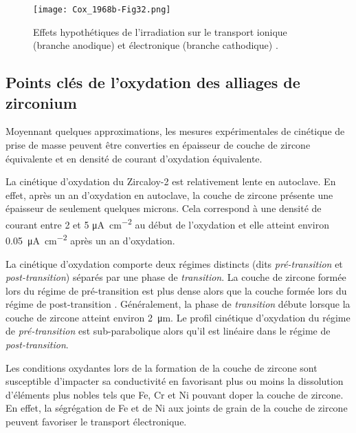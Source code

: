 \begin{refsection}
    \begin{figure}[H]
        \centering
        \texttt{[image: Cox\_1968b-Fig32.png]}
        \caption[Effets hypothétiques de l'irradiation sur le transport ionique et électronique.]
        {Effets hypothétiques de
    l'irradiation sur le transport ionique (branche anodique) et électronique
        (branche cathodique) \citep{Cox1968-1}.}
        \label{fig:irradiation_effect_IE_plots}
    \end{figure}
    

    
    \subsection{Points clés de l'oxydation des alliages de zirconium}
        
        Moyennant quelques approximations, les mesures expérimentales de cinétique de prise de masse peuvent être
        converties en épaisseur de couche de zircone équivalente et en densité de courant d'oxydation équivalente. 

        La cinétique d'oxydation du Zircaloy-2 est relativement lente en autoclave. En effet, après un an d'oxydation en
        autoclave, la couche de zircone présente une épaisseur de seulement quelques microns. Cela correspond à une
        densité de courant entre 2 et 5 \si{\micro\ampere\per\square\centi\meter} au début de l'oxydation et elle
        atteint environ \SI{0.05}{\micro\ampere\per\square\centi\meter} après un an d'oxydation.

        La cinétique d'oxydation comporte deux régimes distincts (dits \emph{pré-transition} et \emph{post-transition}) séparés par
        une phase de \emph{transition}. La couche de zircone formée lors du 
        régime de pré-transition est plus dense alors que la couche formée lors du régime de post-transition 
        \citep{IAEA1998}. Généralement, la phase de \emph{transition} débute lorsque la couche de zircone atteint
        environ \SI{2}{\micro\meter}. Le profil cinétique d'oxydation du régime de
        \emph{pré-transition} est sub-parabolique alors qu'il est linéaire dans le régime de \emph{post-transition}.

        Les conditions oxydantes lors de la formation de la couche de zircone sont susceptible d'impacter sa
        conductivité en favorisant plus ou moins la dissolution d'éléments plus nobles tels que Fe, Cr et Ni
        pouvant doper la couche de zircone. En effet, la ségrégation de Fe et
        de Ni aux joints de grain de la couche de zircone peuvent favoriser le transport électronique.


\end{refsection}
